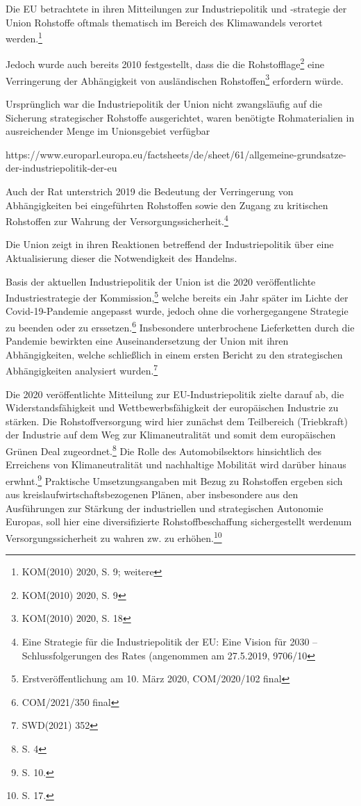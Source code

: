 \documentclass[12pt,a4paper,oneside]{book} %
\begin{document}
Die EU betrachtete in ihren Mitteilungen zur Industriepolitik und -strategie der Union Rohstoffe oftmals thematisch im Bereich des Klimawandels verortet werden.\footnote{KOM(2010) 2020, S. 9; weitere}
	
Jedoch wurde auch bereits 2010 festgestellt, dass die die \glqq Rohstofflage\grqq \footnote{KOM(2010) 2020, S. 9} eine Verringerung der Abhängigkeit von ausländischen Rohstoffen\footnote{KOM(2010) 2020, S. 18} erfordern würde.

Ursprünglich war die Industriepolitik der Union nicht zwangsläufig auf die Sicherung strategischer Rohstoffe ausgerichtet, waren benötigte Rohmaterialien in ausreichender Menge im Unionsgebiet verfügbar
	
https://www.europarl.europa.eu/factsheets/de/sheet/61/allgemeine-grundsatze-der-industriepolitik-der-eu

Auch der Rat unterstrich 2019 die Bedeutung der Verringerung von Abhängigkeiten bei eingeführten Rohstoffen sowie den Zugang zu kritischen Rohstoffen zur Wahrung der Versorgungssicherheit.\footnote{Eine Strategie für die Industriepolitik der EU: Eine Vision für 2030 – Schlussfolgerungen des Rates (angenommen am 27.5.2019, 9706/10}
	
Die Union zeigt in ihren Reaktionen betreffend der Industriepolitik über eine Aktualisierung dieser die Notwendigkeit des Handelns.
	
Basis der aktuellen Industriepolitik der Union ist die 2020 veröffentlichte Industriestrategie der Kommission,\footnote{Erstveröffentlichung am 10. März 2020, COM/2020/102 final} welche bereits ein Jahr später im Lichte der Covid-19-Pandemie angepasst wurde, jedoch ohne die vorhergegangene Strategie zu beenden oder zu erssetzen.\footnote{COM/2021/350 final}	Insbesondere unterbrochene Lieferketten durch die Pandemie bewirkten eine Auseinandersetzung der Union mit ihren Abhängigkeiten, welche schließlich in einem ersten Bericht zu den strategischen Abhängigkeiten analysiert wurden.\footnote{SWD(2021) 352}

Die 2020 veröffentlichte Mitteilung zur EU-Industriepolitik zielte darauf ab, die Widerstandsfähigkeit und Wettbewerbsfähigkeit der europäischen Industrie zu stärken. Die Rohstoffversorgung wird hier zunächst dem Teilbereich (\glqq Triebkraft\grqq) der Industrie auf dem Weg zur Klimaneutralität und somit dem europäischen Grünen Deal zugeordnet.\footnote{S. 4} Die Rolle des Automobilsektors hinsichtlich des Erreichens von Klimaneutralität und nachhaltige Mobilität wird darüber hinaus erwhnt.\footnote{S. 10.} Praktische Umsetzungsangaben mit Bezug zu Rohstoffen ergeben sich aus kreislaufwirtschaftsbezogenen Plänen, aber insbesondere aus den Ausführungen zur Stärkung der industriellen und strategischen Autonomie Europas, soll hier eine \glqq diversifizierte Rohstoffbeschaffung sichergestellt werden\glqq um Versorgungssicherheit zu wahren zw. zu erhöhen.\footnote{S. 17.}
\end{document}
